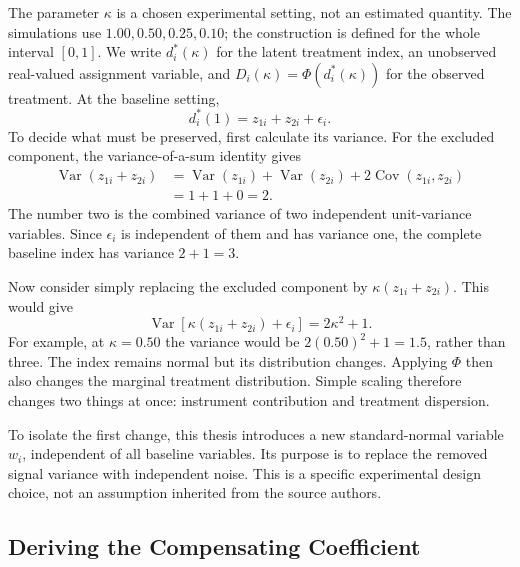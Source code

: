 The parameter $\kappa$ is a chosen experimental setting, not an estimated quantity. The simulations use $1.00,0.50,0.25,0.10$; the construction is defined for the whole interval $[0,1]$. We write $d_i^*(\kappa)$ for the latent treatment index, an unobserved real-valued assignment variable, and $D_i(\kappa)=\Phi(d_i^*(\kappa))$ for the observed treatment. At the baseline setting,
\[
 d_i^*(1)=z_{1i}+z_{2i}+\epsilon_i.
\]
To decide what must be preserved, first calculate its variance. For the excluded component, the variance-of-a-sum identity gives
\[
 \begin{aligned}
 \operatorname{Var}(z_{1i}+z_{2i})
 &=\operatorname{Var}(z_{1i})+\operatorname{Var}(z_{2i})
   +2\operatorname{Cov}(z_{1i},z_{2i})\\
 &=1+1+0=2.
 \end{aligned}
\]
The number two is the combined variance of two independent unit-variance variables. Since $\epsilon_i$ is independent of them and has variance one, the complete baseline index has variance $2+1=3$.

Now consider simply replacing the excluded component by $\kappa(z_{1i}+z_{2i})$. This would give
\[
 \operatorname{Var}\!\left[\kappa(z_{1i}+z_{2i})+\epsilon_i\right]
 =2\kappa^2+1.
\]
For example, at $\kappa=0.50$ the variance would be $2(0.50)^2+1=1.5$, rather than three. The index remains normal but its distribution changes. Applying $\Phi$ then also changes the marginal treatment distribution. Simple scaling therefore changes two things at once: instrument contribution and treatment dispersion.

To isolate the first change, this thesis introduces a new standard-normal variable $w_i$, independent of all baseline variables. Its purpose is to replace the removed signal variance with independent noise. This is a specific experimental design choice, not an assumption inherited from the source authors.

\subsection{Deriving the Compensating Coefficient}

